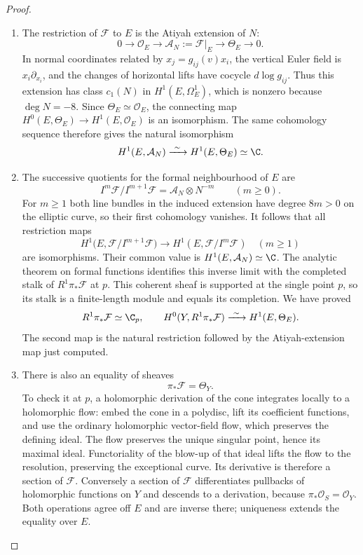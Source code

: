 \begin{proof}
\begin{enumerate}[label=\arabic*.,leftmargin=*]
\item The restriction of $\mathcal F$ to $E$ is the Atiyah extension
of $N$:
\[
 0\longrightarrow\mathcal O_E
 \longrightarrow\mathcal A_N:=\mathcal F|_E
 \longrightarrow\Theta_E\longrightarrow0.
\]
In normal coordinates related by $x_j=g_{ij}(v)x_i$, the
vertical Euler field is $x_i\partial_{x_i}$, and the changes of
horizontal lifts have cocycle $d\log g_{ij}$.
Thus this extension has class $c_1(N)$ in
$H^1(E,\Omega^1_E)$, which is nonzero because $\deg N=-8$.
Since $\Theta_E\simeq\mathcal O_E$, the connecting map
$H^0(E,\Theta_E)\to H^1(E,\mathcal O_E)$ is an isomorphism.
The same cohomology sequence therefore gives the natural
isomorphism
\[
 H^1(E,\mathcal A_N)\xrightarrow{\ \sim\ }
 H^1(E,\Theta_E)\simeq\C.
\]

\item The successive quotients for the formal neighbourhood of $E$ are
\[
 I^m\mathcal F/I^{m+1}\mathcal F
     =\mathcal A_N\otimes N^{-m}\qquad(m\ge0).
\]
For $m\ge1$ both line bundles in the induced extension have
degree $8m>0$ on the elliptic curve, so their first cohomology
vanishes.  It follows that all restriction maps
\[
 H^1\bigl(E,\mathcal F/I^{m+1}\mathcal F\bigr)
 \longrightarrow H^1(E,\mathcal F/I^m\mathcal F)
 \quad(m\ge1)
\]
are isomorphisms.  Their common value is
$H^1(E,\mathcal A_N)\simeq\C$.
The analytic theorem on formal functions
\citep[Section~6, Hauptsatz~IIa, p.~59]{Grauert60}
identifies this inverse limit with the completed stalk of
$R^1\pi_*\mathcal F$ at $p$.
This coherent sheaf is supported at the single point $p$,
so its stalk is a finite-length module and equals its completion.
We have proved
\[
 R^1\pi_*\mathcal F\simeq\C_p,
 \qquad
 H^0(Y,R^1\pi_*\mathcal F)
    \xrightarrow{\ \sim\ }H^1(E,\Theta_E).
\]
The second map is the natural restriction followed by the
Atiyah-extension map just computed.

\item There is also an equality of sheaves
\[
 \pi_*\mathcal F=\Theta_Y.
\]
To check it at $p$, a holomorphic derivation of the cone
integrates locally to a holomorphic flow: embed the cone in a
polydisc, lift its coefficient functions, and use the ordinary
holomorphic vector-field flow, which preserves the defining ideal.
The flow preserves the unique singular point, hence its maximal
ideal.  Functoriality of the blow-up of that ideal lifts the flow
to the resolution, preserving the exceptional curve.
Its derivative is therefore a section of $\mathcal F$.
Conversely a section of $\mathcal F$ differentiates pullbacks
of holomorphic functions on $Y$ and descends to a derivation,
because $\pi_*\mathcal O_S=\mathcal O_Y$.
Both operations agree off $E$ and are inverse there; uniqueness
extends the equality over $E$.


\end{enumerate}
\end{proof}
